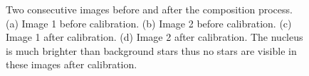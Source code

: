 \begin{figure}[htb]
\begin{subfigure}[b]{0.48\textwidth}
            \caption{}
            \label{fig:composition_after_2}
    \end{subfigure}
    \caption{Two consecutive images before and after the composition process. (a) Image 1 before calibration. (b) Image 2 before calibration. (c) Image 1 after calibration. (d) Image 2 after calibration. The nucleus is much brighter than background stars thus no stars are visible in these images after calibration.}
    \label{fig:composition_before_after}
\end{figure}




